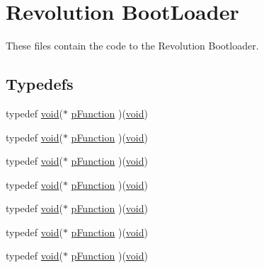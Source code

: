 \hypertarget{group___revolution_b_l}{\section{Revolution Boot\-Loader}
\label{group___revolution_b_l}
}


These files contain the code to the Revolution Bootloader.  


\subsection*{Typedefs}
\begin{DoxyCompactItemize}
\item 
typedef \hyperlink{group___n_a_m_e_ga18028b8badbf1ea7e704ccac3c488e82}{void}($\ast$ \hyperlink{group___revolution_b_l_ga9227bf1f1a9c633a0cc9ca50cc761c1a}{p\-Function} )(\hyperlink{group___n_a_m_e_ga18028b8badbf1ea7e704ccac3c488e82}{void})
\item 
typedef \hyperlink{group___n_a_m_e_ga18028b8badbf1ea7e704ccac3c488e82}{void}($\ast$ \hyperlink{group___revolution_b_l_ga9227bf1f1a9c633a0cc9ca50cc761c1a}{p\-Function} )(\hyperlink{group___n_a_m_e_ga18028b8badbf1ea7e704ccac3c488e82}{void})
\item 
typedef \hyperlink{group___n_a_m_e_ga18028b8badbf1ea7e704ccac3c488e82}{void}($\ast$ \hyperlink{group___revolution_b_l_ga9227bf1f1a9c633a0cc9ca50cc761c1a}{p\-Function} )(\hyperlink{group___n_a_m_e_ga18028b8badbf1ea7e704ccac3c488e82}{void})
\item 
typedef \hyperlink{group___n_a_m_e_ga18028b8badbf1ea7e704ccac3c488e82}{void}($\ast$ \hyperlink{group___revolution_b_l_ga9227bf1f1a9c633a0cc9ca50cc761c1a}{p\-Function} )(\hyperlink{group___n_a_m_e_ga18028b8badbf1ea7e704ccac3c488e82}{void})
\item 
typedef \hyperlink{group___n_a_m_e_ga18028b8badbf1ea7e704ccac3c488e82}{void}($\ast$ \hyperlink{group___revolution_b_l_ga9227bf1f1a9c633a0cc9ca50cc761c1a}{p\-Function} )(\hyperlink{group___n_a_m_e_ga18028b8badbf1ea7e704ccac3c488e82}{void})
\item 
typedef \hyperlink{group___n_a_m_e_ga18028b8badbf1ea7e704ccac3c488e82}{void}($\ast$ \hyperlink{group___revolution_b_l_ga9227bf1f1a9c633a0cc9ca50cc761c1a}{p\-Function} )(\hyperlink{group___n_a_m_e_ga18028b8badbf1ea7e704ccac3c488e82}{void})
\item 
typedef \hyperlink{group___n_a_m_e_ga18028b8badbf1ea7e704ccac3c488e82}{void}($\ast$ \hyperlink{group___revolution_b_l_ga9227bf1f1a9c633a0cc9ca50cc761c1a}{p\-Function} )(\hyperlink{group___n_a_m_e_ga18028b8badbf1ea7e704ccac3c488e82}{void})
\end{DoxyCompactItemize}
